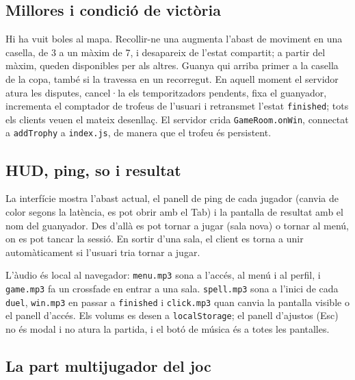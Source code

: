 \documentclass[11pt,a4paper]{article}
\begin{document}
\subsection{Millores i condició de victòria}

Hi ha vuit boles al mapa. Recollir-ne una augmenta l'abast de moviment en una casella,
de 3 a un màxim de 7, i desapareix de l'estat compartit; a partir del màxim, queden
disponibles per als altres. Guanya qui arriba primer a la casella de la copa, també si
la travessa en un recorregut. En aquell moment el servidor atura les disputes,
cancel·la els temporitzadors pendents, fixa el guanyador, incrementa el comptador de
trofeus de l'usuari i retransmet l'estat \texttt{finished}; tots els clients veuen el
mateix desenllaç. El servidor crida \texttt{GameRoom.onWin}, connectat a
\texttt{addTrophy} a \texttt{index.js}, de manera que el trofeu és persistent.

\subsection{HUD, ping, so i resultat}

La interfície mostra l'abast actual, el panell de ping de cada jugador (canvia de color
segons la latència, es pot obrir amb el Tab) i la pantalla de resultat amb el nom del
guanyador. Des d'allà es pot tornar a jugar (sala nova) o tornar al menú, on es pot
tancar la sessió. En sortir d'una sala, el client es torna a unir automàticament si
l'usuari tria tornar a jugar.

L'àudio és local al navegador: \texttt{menu.mp3} sona a l'accés, al menú i al perfil, i
\texttt{game.mp3} fa un crossfade en entrar a una sala. \texttt{spell.mp3} sona a
l'inici de cada \texttt{duel}, \texttt{win.mp3} en passar a \texttt{finished} i
\texttt{click.mp3} quan canvia la pantalla visible o el panell d'accés. Els volums es
desen a \texttt{localStorage}; el panell d'ajustos (Esc) no és modal i no atura la
partida, i el botó de música és a totes les pantalles.

\subsection{La part multijugador del joc}
\end{document}
